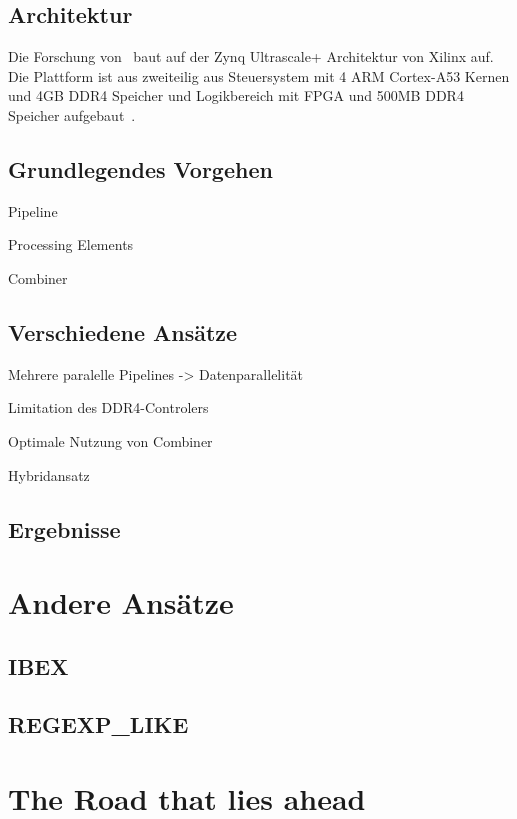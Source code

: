\documentclass[conference]{IEEEtran}
\begin{document}
\subsection{Architektur}
Die Forschung von~\cite{lisa_column_2018} baut auf der Zynq Ultrascale+ Architektur von Xilinx auf. Die Plattform ist aus zweiteilig aus Steuersystem mit
4 ARM Cortex-A53 Kernen und 4GB DDR4 Speicher und Logikbereich mit FPGA und 500MB DDR4 Speicher aufgebaut~\cite{lisa_column_2018}.

\subsection{Grundlegendes Vorgehen}
Pipeline

Processing Elements

Combiner



\subsection{Verschiedene Ansätze}

Mehrere paralelle Pipelines -> Datenparallelität

Limitation des DDR4-Controlers

Optimale Nutzung von Combiner

Hybridansatz



\subsection{Ergebnisse}

\section{Andere Ansätze}

\subsection{IBEX}

\subsection{REGEXP\_LIKE}

\section{The Road that lies ahead}



\end{document}

